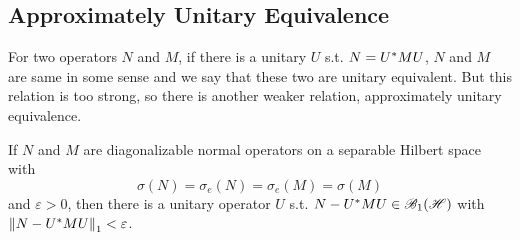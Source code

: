 \documentclass[a4paper,11pt]{report}
\begin{document}
\subsection{Approximately Unitary Equivalence}

For two operators $N$ and $M$, if there is a unitary $U$ s.t. $N = U^{*}MU$, $N$ and $M$ are same in some sense and we say that these two are unitary equivalent. But this relation is too strong, so there is another weaker relation, approximately unitary equivalence.

\begin{lem}
	If $N$ and $M$ are diagonalizable normal operators on a separable Hilbert space with
	\begin{equation*}
		\sigma(N) = \sigma_e(N) = \sigma_e(M) = \sigma(M)
	\end{equation*}
	and $\varepsilon > 0$, then there is a unitary operator $U$ s.t. $N-U^{*}MU \in \mathscr{B}_{1}\mathscr{(H)}$ with $\left\lVert N-U^{*}MU\right\lVert_1 < \varepsilon$. 
\end{lem}
\end{document}
